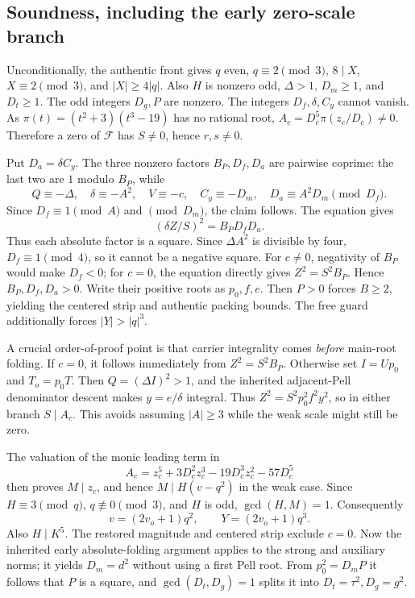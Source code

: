 \documentclass[11pt]{article}
\begin{document}
\subsection{Soundness, including the early zero-scale branch}
Unconditionally, the authentic front gives \(q\) even, \(q\equiv2\pmod3\),
\(8\mid X\), \(X\equiv2\pmod3\), and \(|X|\ge4|q|\).
Also \(H\) is nonzero odd, \(\Delta>1\), \(D_m\ge1\), and
\(D_t\ge1\). The odd integers \(D_g,P\) are nonzero. The integers
\(D_f,\delta,C_y\) cannot vanish. As
\(\pi(t)=(t^2+3)(t^3-19)\) has no rational root,
\(A_c=D_c^5\pi(z_c/D_c)\ne0\). Therefore a zero of \(\mathcal F\)
has \(S\ne0\), hence \(r,s\ne0\).

Put \(D_a=\delta C_y\). The three nonzero factors \(B_P,D_f,D_a\)
are pairwise coprime: the last two are \(1\) modulo \(B_P\), while
\[
 Q\equiv-\Delta,\quad \delta\equiv-A^2,\quad
 V\equiv-c,\quad C_y\equiv-D_m,\quad D_a\equiv A^2D_m\pmod{D_f}.
\]
Since \(D_f\equiv1\pmod A\) and \(\pmod{D_m}\), the claim follows.
The equation gives
\[
 (\delta Z/S)^2=B_PD_fD_a.
\]
Thus each absolute factor is a square. Since \(\Delta A^2\) is divisible
by four, \(D_f\equiv1\pmod4\), so it cannot be a negative square.
For \(c\ne0\), negativity of \(B_P\) would make \(D_f<0\); for
\(c=0\), the equation directly gives \(Z^2=S^2B_P\). Hence
\(B_P,D_f,D_a>0\). Write their positive roots as \(p_0,f,e\).
Then \(P>0\) forces \(B\ge2\), yielding the centered strip and authentic
packing bounds. The free guard additionally forces \(|Y|>|q|^3\).

A crucial order-of-proof point is that carrier integrality comes
\emph{before} main-root folding. If \(c=0\), it follows immediately from
\(Z^2=S^2B_P\). Otherwise set \(I=Up_0\) and \(T_o=p_0T\).
Then \(Q=(\Delta I)^2>1\), and the inherited adjacent-Pell denominator
descent makes \(y=e/\delta\) integral. Thus
\(Z^2=S^2p_0^2f^2y^2\), so in either branch \(S\mid A_c\).
This avoids assuming \(|A|\ge3\) while the weak scale might still be zero.

The valuation of the monic leading term in
\[
 A_c=z_c^5+3D_c^2z_c^3-19D_c^3z_c^2-57D_c^5
\]
then proves \(M\mid z_c\), and hence \(M\mid H(v-q^2)\) in the weak
case. Since \(H\equiv3\pmod q\), \(q\not\equiv0\pmod3\), and
\(H\) is odd, \(\gcd(H,M)=1\). Consequently
\[
 v=(2v_o+1)q^2,\qquad Y=(2v_o+1)q^3.
\]
Also \(H\mid K^5\). The restored magnitude and centered strip exclude
\(c=0\). Now the inherited early absolute-folding argument applies to
the strong and auxiliary norms; it yields \(D_m=d^2\) without using a
first Pell root. From \(p_0^2=D_mP\) it follows that \(P\) is a square,
and \(\gcd(D_t,D_g)=1\) splits it into \(D_t=\tau^2,D_g=g^2\).
\end{document}
